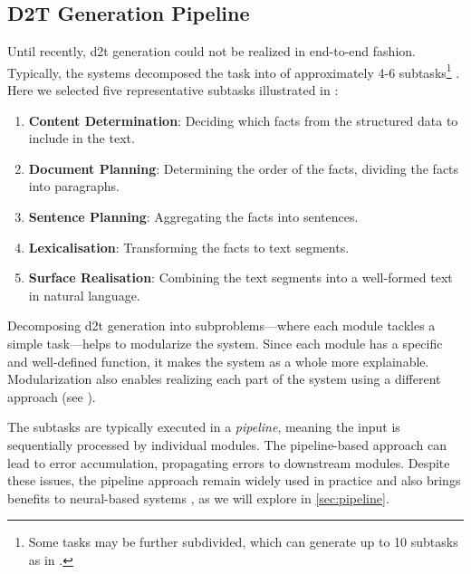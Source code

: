 \subsection{D2T Generation Pipeline}
\label{sec:d2t-pipeline}
Until recently, \ac{d2t} generation could not be realized in end-to-end fashion. Typically, the systems decomposed the task into of approximately 4-6 subtasks\footnote{Some tasks may be further subdivided, which can generate up to 10 subtasks as in \citet{milleModD2TMultilayerDataset2023}.} \cite{reiterBuildingAppliedNatural1997,reiterArchitectureDatatoTextSystems2007,gattSurveyStateArt2018}. Here we selected five representative subtasks illustrated in :

\begin{enumerate}
    \item \textbf{Content Determination}: Deciding which facts from the structured data
          to include in the text.
    \item \textbf{Document Planning}: Determining the order of the
          facts, dividing the facts into paragraphs.
    \item \textbf{Sentence Planning}: Aggregating the facts into
          sentences.
    \item \textbf{Lexicalisation}: Transforming the facts to text segments.
    \item \textbf{Surface Realisation}: Combining the text segments into a well-formed text in natural language.
\end{enumerate}

Decomposing \ac{d2t} generation into subproblems---where each module tackles a simple task---helps to modularize the system. Since each module has a specific and well-defined function, it makes the system as a whole more explainable. Modularization also enables realizing each part of the system using a different approach (see ).

The subtasks are typically executed in a \emph{pipeline}, meaning the input is sequentially processed by individual modules. The pipeline-based approach can lead to error accumulation, propagating errors to downstream modules. Despite these issues, the pipeline approach remain widely used in practice
and also brings benefits to neural-based systems \cite{ferreiraNeuralDatatotextGeneration2019}, as we will explore in \autoref{sec:pipeline}.


